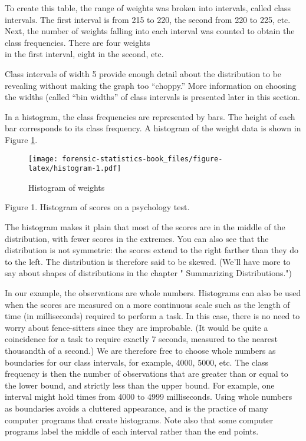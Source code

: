 \documentclass[
]{book}
\begin{document}
To create this table, the range of weights was broken into intervals, called class intervals.
The first interval is from 215 to 220, the second from 220 to 225, etc. Next, the number of weights
falling into each interval was counted to obtain the class frequencies. There are four weights\\
in the first interval, eight in the second, etc.

Class intervals of width 5 provide enough detail about the distribution to be revealing without
making the graph too ``choppy.'' More information on choosing the widths (called ``bin widths'' of
class intervals is presented later in this section.

In a histogram, the class frequencies are represented by bars. The height of each bar corresponds
to its class frequency. A histogram of the weight data is shown in Figure \ref{fig:histogram}.

\begin{figure}
\centering
\texttt{[image: forensic-statistics-book\_files/figure-latex/histogram-1.pdf]}
\caption{\label{fig:histogram}Histogram of weights}
\end{figure}

Figure 1. Histogram of scores on a psychology test.

The histogram makes it plain that most of the scores are in the middle of the distribution, with fewer scores in the extremes. You can also see that the distribution is not symmetric: the scores extend to the right farther than they do to the left. The distribution is therefore said to be skewed. (We'll have more to say about shapes of distributions in the chapter " Summarizing Distributions.")

In our example, the observations are whole numbers. Histograms can also be used when the scores are measured on a more continuous scale such as the length of time (in milliseconds) required to perform a task. In this case, there is no need to worry about fence-sitters since they are improbable. (It would be quite a coincidence for a task to require exactly 7 seconds, measured to the nearest thousandth of a second.) We are therefore free to choose whole numbers as boundaries for our class intervals, for example, 4000, 5000, etc. The class frequency is then the number of observations that are greater than or equal to the lower bound, and strictly less than the upper bound. For example, one interval might hold times from 4000 to 4999 milliseconds. Using whole numbers as boundaries avoids a cluttered appearance, and is the practice of many computer programs that create histograms. Note also that some computer programs label the middle of each interval rather than the end points.
\end{document}
